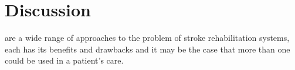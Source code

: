 \documentclass[journal]{IEEEtran}
\begin{document}
%
%


%



\section{Discussion}
 are a wide range of approaches to the problem of stroke rehabilitation systems, 
each has its benefits and drawbacks and it may be the case that more than one 
could be used in a patient's care.
\end{document}
